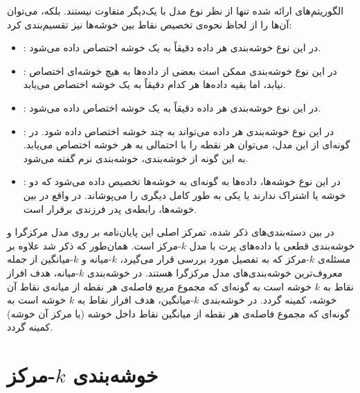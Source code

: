 الگوریتم‌های ارائه شده تنها از نظر نوع مدل با یک‌دیگر متفاوت نیستند.
بلکه، می‌توان آن‌ها را از لحاظ نحوه‌ی تخصیص نقاط بین خوشه‌ها نیز تقسیم‌بندی کرد:

\begin{itemize}

\item
{}: در این نوع خوشه‌بندی هر داده دقیقاً به یک خوشه اختصاص داده می‌شود.

\item
{}: در این نوع خوشه‌بندی ممکن است بعضی از داده‌ها به هیچ خوشه‌ای اختصاص نیابد، اما بقیه داده‌ها هر کدام دقیقاً به یک خوشه اختصاص می‌یابد.

\item
{}: در این نوع خوشه‌بندی هر داده دقیقاً به یک خوشه اختصاص داده می‌شود.

\item
{}: در این نوع خوشه‌بندی هر داده می‌تواند به چند خوشه اختصاص داده شود.
در گونه‌ای از این مدل، می‌توان هر نقطه را با احتمالی به هر خوشه اختصاص می‌یابد.
به این گونه از خوشه‌بندی، خوشه‌بندی نرم گفته می‌شود.

\item
{}: در این نوع خوشه‌ها، داده‌ها به گونه‌ای به خوشه‌ها تخصیص داده می‌شود که دو خوشه یا اشتراک ندارند یا یکی به طور کامل دیگری را می‌پوشاند.
در واقع در بین خوشه‌ها، رابطه‌ی پدر فرزندی برقرار است.

\end{itemize}

در بین دسته‌بندی‌های ذکر شده، تمرکز اصلی این پایان‌نامه بر روی مدل مرکزگرا و خوشه‌بندی قطعی با داده‌های پرت با مدل $k$-مرکز است.
همان‌طور که ذکر شد علاوه بر مسئله‌ی $k$-مرکز که به تفصیل مورد بررسی قرار می‌گیرد، $k$-میانه و $k$-میانگین از جمله معروف‌ترین خوشه‌بندی‌های مدل مرکزگرا هستند.
در خوشه‌بندی $k$-میانه، هدف افراز نقاط به $k$ خوشه است به گونه‌ای که مجموع مربع فاصله‌ی هر نقطه از میانه‌ی نقاط آن خوشه، کمینه گردد.
در خوشه‌بندی $k$-میانگین، هدف افراز نقاط به $k$ خوشه است به گونه‌ای که مجموع فاصله‌ی هر نقطه از میانگین نقاط داخل خوشه (یا مرکز آن خوشه) کمینه گردد. 

\section{خوشه‌بندی $k$-مرکز}

